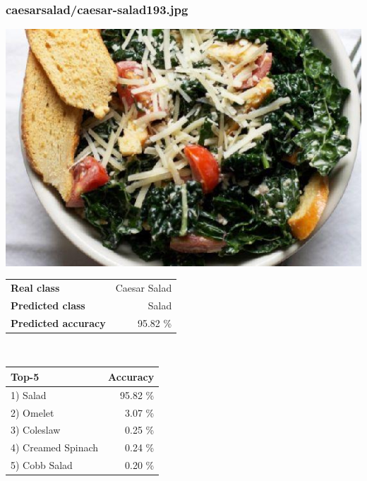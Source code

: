 \subsubsection{caesar\textunderscore salad/caesar-salad193.jpg}

\begin{minipage}[t]{0.4\textwidth}
	\vspace{0pt}
	\includegraphics[width=\linewidth]{images/evaluation-images/caesar_salad/caesar-salad193.jpg}
\end{minipage}
\hfill
\begin{minipage}[t]{0.5\textwidth}
	\vspace{0pt}\raggedright
	\begin{tabularx}{\textwidth}{X r}
		\small \textbf{Real class} & \small Caesar Salad\\
		\small \textbf{Predicted class} & \small Salad\\
		\small \textbf{Predicted accuracy} & \small 95.82 \%
    \end{tabularx}\\
    
    \vspace{6pt}
	\begin{tabularx}{\textwidth}{X r}
        \small \textbf{Top-5} & \small \textbf{Accuracy} \\
        \hline
		\small 1) Salad & \small 95.82 \%\\\small 2) Omelet & \small 3.07 \%\\\small 3) Coleslaw & \small 0.25 \%\\\small 4) Creamed Spinach & \small 0.24 \%\\\small 5) Cobb Salad & \small 0.20 \%
    \end{tabularx}
\end{minipage}
    
